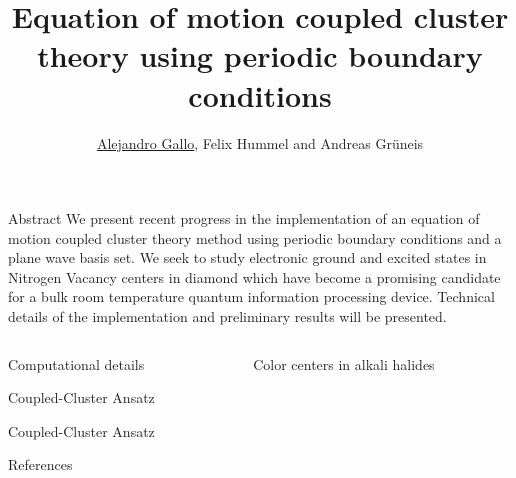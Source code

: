 \documentclass[final]{beamer}
\title{
  Equation of motion coupled cluster theory using periodic boundary conditions
}
\author{\underline{Alejandro Gallo}, Felix Hummel and Andreas Gr\"uneis}
\institute[]{
  Technical University of Vienna
}
\begin{document}
\nocite{*}
\begin{frame}[fragile]{}

  \begin{block}{\large Abstract}
    We present recent progress in the implementation of an equation of motion
    coupled cluster theory method using periodic boundary conditions and a plane
    wave basis set.  We seek to study electronic ground and excited states in
    Nitrogen Vacancy centers in diamond which have become a promising candidate
    for a bulk room temperature quantum information processing device. Technical
    details of the implementation and preliminary results will be presented.
  \end{block}
  \begin{columns}[t]
    \begin{column}{.49\linewidth}
      \begin{block}{\large Computational details}
        
      \end{block}
      \begin{block}{\large Coupled-Cluster Ansatz}
        
      \end{block}
      \begin{block}{\large Coupled-Cluster Ansatz}
        
      \end{block}

      \begin{block}{\large References}
        \printbibliography
      \end{block}

    \end{column}


    \begin{column}{.49\linewidth}
      \begin{block}{\large Color centers in alkali halides}
      \begin{center}


\end{center}
\end{block}
\end{column}
\end{columns}
\end{frame}
\end{document}
